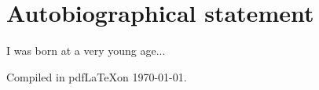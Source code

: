 \part*{Autobiographical statement}

I was born at a very young age...

\vfill
Compiled in pdf\LaTeX on \today.
